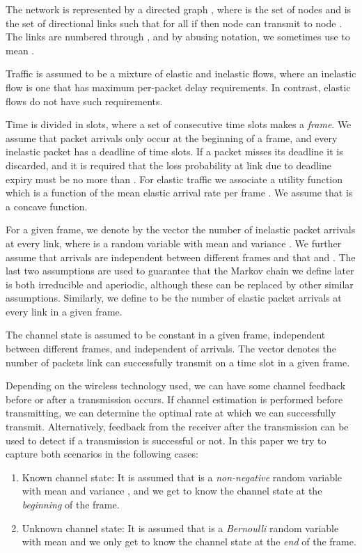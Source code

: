 \documentclass[conference]{IEEEtran}
\begin{document}
The network is represented by a directed graph , where  is the set of nodes and  is the set of directional links such that for all  if  then node  can transmit to node . The links are numbered  through , and by abusing notation, we sometimes use  to mean .

Traffic is assumed to be a mixture of elastic and inelastic flows, where an inelastic flow is one that has maximum per-packet delay requirements. In contrast, elastic flows do not have such requirements.

Time is divided in slots, where a set of  consecutive time slots makes a \emph{frame}. We assume that packet arrivals only occur at the beginning of a frame, and every inelastic packet has a deadline of  time slots. If a packet misses its deadline it is discarded, and it is required that the loss probability at link  due to deadline expiry must be no more than . For elastic traffic we associate a utility function  which is a function of the mean elastic arrival rate per frame . We assume that  is a concave function.

For a given frame, we denote by the vector  the number of inelastic packet arrivals at every link, where  is a random variable with mean  and variance . We further assume that arrivals are independent between different frames and that  and . The last two assumptions are used to guarantee that the Markov chain we define later is both irreducible and aperiodic, although these can be replaced by other similar assumptions. Similarly, we define  to be the number of elastic packet arrivals at every link in a given frame.

The channel state is assumed to be constant in a given frame, independent between different frames, and independent of arrivals. The vector  denotes the number of packets link  can successfully transmit on a time slot in a given frame.

Depending on the wireless technology used, we can have some channel feedback before or after a transmission occurs. If channel estimation is performed before transmitting, we can determine the optimal rate at which we can successfully transmit.  Alternatively, feedback from the receiver after the transmission can be used to detect if a transmission is successful or not. In this paper we try to capture both scenarios in the following cases:

\begin{enumerate}
	\item Known channel state: It is assumed that  is a \emph{non-negative} random variable with mean  and variance , and we get to know the channel state at the \emph{beginning} of the frame.
	\item Unknown channel state: It is assumed that  is a \emph{Bernoulli} random variable with mean  and we only get to know the channel state at the \emph{end} of the frame.
\end{enumerate}
\end{document}
